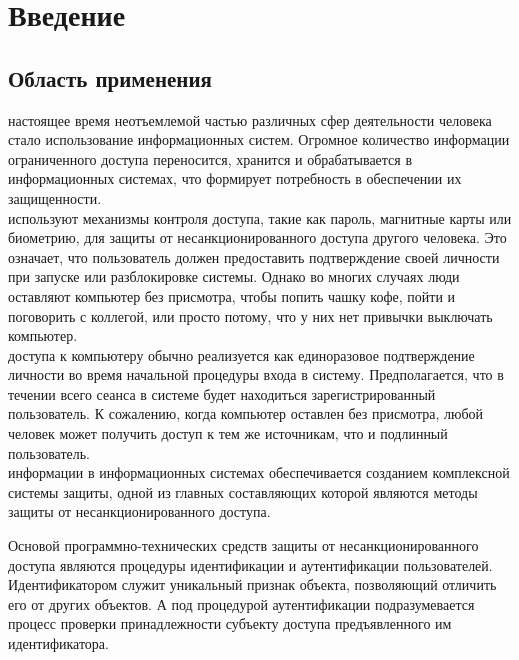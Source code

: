 \documentclass[12pt]{article}
\begin{document}
    \newpage



    \section{Введение}
    \label{sec:Intro}
    
    \subsection{Область применения}
    \label{sec:Intro:ApplicationArea}
    
     настоящее время неотъемлемой частью различных сфер деятельности человека стало использование информационных систем. Огромное количество информации ограниченного доступа переносится, хранится и обрабатывается в информационных системах, что формирует потребность в обеспечении их защищенности. \\
     используют механизмы контроля доступа, такие как пароль, магнитные карты или биометрию, для защиты от несанкционированного доступа другого человека. Это означает, что пользователь должен предоставить подтверждение своей личности при запуске или разблокировке системы. Однако во многих случаях люди оставляют компьютер без присмотра, чтобы попить чашку кофе, пойти и поговорить с коллегой, или просто потому, что у них нет привычки выключать компьютер. \\
     доступа к компьютеру обычно реализуется как единоразовое подтверждение личности во время начальной процедуры входа в систему. Предполагается, что в течении всего сеанса в системе будет находиться зарегистрированный пользователь. К сожалению, когда компьютер оставлен без присмотра, любой человек может получить доступ к тем же источникам, что и подлинный пользователь. \\
     информации в информационных системах обеспечивается созданием комплексной системы защиты, одной из главных составляющих которой являются методы защиты от несанкционированного доступа. \\
    \par Основой программно-технических средств защиты от несанкционированного доступа являются процедуры идентификации и аутентификации пользователей. Идентификатором служит уникальный признак объекта, позволяющий отличить его от других объектов. А под процедурой аутентификации подразумевается процесс проверки принадлежности субъекту доступа предъявленного им идентификатора. \\
\end{document}
